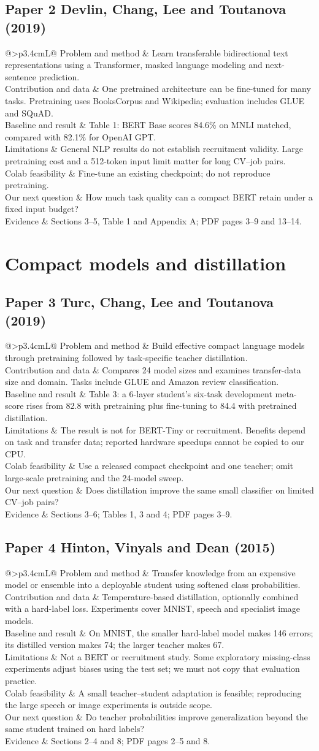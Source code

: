\documentclass[10pt,a4paper]{article}
\makeatletter
\newcommand{\paper}[9]{%
\subsection*{#1}
\begin{tabularx}{\linewidth}{@{}>{\bfseries}p{3.4cm}L@{}}\toprule
Problem and method & #2\\
Contribution and data & #3\\
Baseline and result & #4\\
Limitations & #5\\
Colab feasibility & #6\\
Our next question & #7\\
Evidence & #8\\\bottomrule
\end{tabularx}}
\makeatother
\begin{document}
\paper{Paper 2 \quad Devlin, Chang, Lee and Toutanova (2019)}
{Learn transferable bidirectional text representations using a Transformer, masked language modeling and next-sentence prediction.}
{One pretrained architecture can be fine-tuned for many tasks. Pretraining uses BooksCorpus and Wikipedia; evaluation includes GLUE and SQuAD.}
{Table 1: BERT Base scores 84.6\% on MNLI matched, compared with 82.1\% for OpenAI GPT.}
{General NLP results do not establish recruitment validity. Large pretraining cost and a 512-token input limit matter for long CV--job pairs.}
{Fine-tune an existing checkpoint; do not reproduce pretraining.}
{How much task quality can a compact BERT retain under a fixed input budget?}
{Sections 3--5, Table 1 and Appendix A; PDF pages 3--9 and 13--14.}{}

\section{Compact models and distillation}
\paper{Paper 3 \quad Turc, Chang, Lee and Toutanova (2019)}
{Build effective compact language models through pretraining followed by task-specific teacher distillation.}
{Compares 24 model sizes and examines transfer-data size and domain. Tasks include GLUE and Amazon review classification.}
{Table 3: a 6-layer student's six-task development meta-score rises from 82.8 with pretraining plus fine-tuning to 84.4 with pretrained distillation.}
{The result is not for BERT-Tiny or recruitment. Benefits depend on task and transfer data; reported hardware speedups cannot be copied to our CPU.}
{Use a released compact checkpoint and one teacher; omit large-scale pretraining and the 24-model sweep.}
{Does distillation improve the same small classifier on limited CV--job pairs?}
{Sections 3--6; Tables 1, 3 and 4; PDF pages 3--9.}{}

\paper{Paper 4 \quad Hinton, Vinyals and Dean (2015)}
{Transfer knowledge from an expensive model or ensemble into a deployable student using softened class probabilities.}
{Temperature-based distillation, optionally combined with a hard-label loss. Experiments cover MNIST, speech and specialist image models.}
{On MNIST, the smaller hard-label model makes 146 errors; its distilled version makes 74; the larger teacher makes 67.}
{Not a BERT or recruitment study. Some exploratory missing-class experiments adjust biases using the test set; we must not copy that evaluation practice.}
{A small teacher--student adaptation is feasible; reproducing the large speech or image experiments is outside scope.}
{Do teacher probabilities improve generalization beyond the same student trained on hard labels?}
{Sections 2--4 and 8; PDF pages 2--5 and 8.}{}
\end{document}
